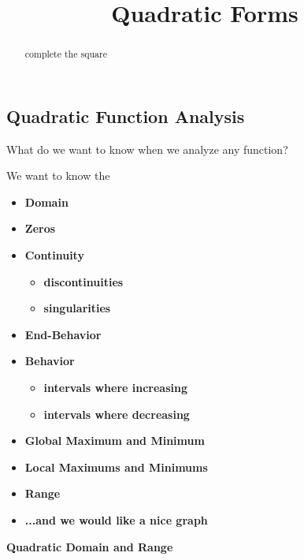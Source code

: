 \documentclass{ximera}
\title{Quadratic Forms}
\begin{document}
\begin{abstract}
complete the square
\end{abstract}
\maketitle




\subsection*{Quadratic Function Analysis}

What do we want to know when we analyze any function?

We want to know the 
\begin{itemize}
     \item \textbf{\textcolor{red!80!black}{Domain}} 
     \item \textbf{\textcolor{red!80!black}{Zeros}} 
     \item \textbf{\textcolor{red!80!black}{Continuity}} 
\begin{itemize}
     \item \textbf{\textcolor{purple!85!blue}{discontinuities}} 
     \item \textbf{\textcolor{purple!85!blue}{singularities}} 
\end{itemize}
     \item \textbf{\textcolor{red!80!black}{End-Behavior}} 
     \item \textbf{\textcolor{red!80!black}{Behavior}} 
\begin{itemize}
     \item \textbf{\textcolor{purple!85!blue}{intervals where increasing}} 
     \item \textbf{\textcolor{purple!85!blue}{intervals where decreasing}} 
\end{itemize}
     \item \textbf{\textcolor{red!80!black}{Global Maximum and Minimum}} 
     \item \textbf{\textcolor{red!80!black}{Local Maximums and Minimums}} 
     \item \textbf{\textcolor{red!80!black}{Range}} 
     \item \textbf{\textcolor{blue!55!black}{...and we would like a nice graph}} 
\end{itemize}



\textbf{\textcolor{blue!75!black}{Quadratic Domain and Range}} \\
\end{document}
